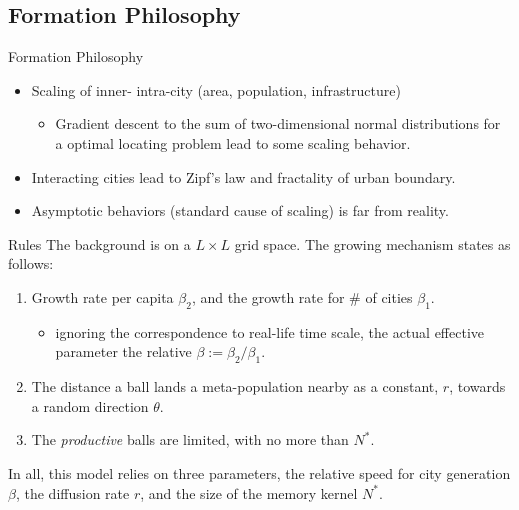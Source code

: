 \documentclass{beamer}
\begin{document}
\subsection{Formation Philosophy}
\begin{frame}{Formation Philosophy}
  \begin{itemize}
    \item Scaling of inner- intra-city (area, population, infrastructure)
    \begin{itemize}
      \item Gradient descent to the sum of two-dimensional normal distributions for a optimal locating problem lead to some scaling behavior.
    \end{itemize}
    \item Interacting cities lead to Zipf's law and fractality of urban boundary. 
    \item Asymptotic behaviors (standard cause of scaling) is far from reality.
  \end{itemize}
\end{frame}

\begin{frame}{Rules}
  The background is on a $L\times L$ grid space. The growing mechanism states as follows:
  \begin{enumerate}
    \item Growth rate per capita $\beta_2$, and the growth rate for \# of cities $\beta_1$. 
    \begin{itemize}
      \item ignoring the correspondence to real-life time scale, the actual effective parameter the relative $\beta:=\beta_2/\beta_1$.
    \end{itemize}
    \item The distance a ball lands a meta-population nearby as a constant, $r$, towards a random direction $\theta$. 
    \item The \emph{productive} balls are limited, with no more than $N^*$. 
  \end{enumerate}
  \vspace{0.5cm}
  In all, this model relies on three parameters, the relative speed for city generation $\beta$, the diffusion rate $r$, and the size of the memory kernel $N^*$.
\end{frame}
\end{document}
